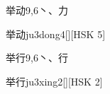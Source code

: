 \begin{entry}{举动}{9,6}{⼂、⼒}
  \begin{phonetics}{举动}{ju3dong4}[][HSK 5]
  \end{phonetics}
\end{entry}

\begin{entry}{举行}{9,6}{⼂、⾏}
  \begin{phonetics}{举行}{ju3xing2}[][HSK 2]
  \end{phonetics}
\end{entry}


